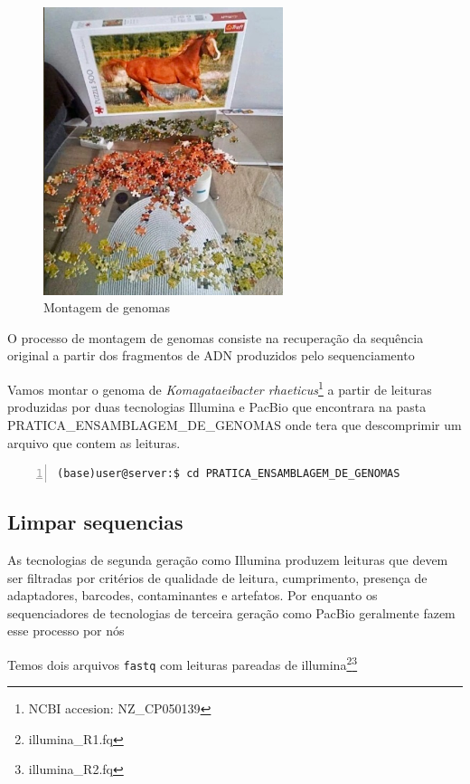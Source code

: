 \documentclass[letter,11pt]{book}
\begin{document}
\begin{figure}[h!]
\centering
 \includegraphics[width=7cm]{Figs/montagem_de_genoma.jpeg}
 \caption{\label{fig:fastqc}Montagem de genomas}
\end{figure}


O processo de montagem de genomas consiste na recuperação da sequência original a partir dos fragmentos de ADN produzidos pelo sequenciamento

Vamos montar o genoma de \emph{Komagataeibacter rhaeticus}\footnote{NCBI accesion: NZ\_CP050139} a partir de leituras produzidas por duas tecnologias Illumina e PacBio que encontrara na pasta PRATICA\_ENSAMBLAGEM\_DE\_GENOMAS onde tera que descomprimir um arquivo que contem as leituras.

\begin{Verbatim}[commandchars=!\{\}, numbers=left,label= indo na pasta de trabalho, frame=topline,fontsize=\scriptsize]
(base)user@server:$ cd PRATICA_ENSAMBLAGEM_DE_GENOMAS
\end{Verbatim}


\subsection{Limpar sequencias}
As tecnologias de segunda geração como Illumina produzem leituras que devem ser filtradas por critérios de qualidade de leitura, cumprimento, presença de adaptadores, barcodes, contaminantes e artefatos.
Por enquanto os sequenciadores de tecnologias de terceira geração como PacBio geralmente fazem esse processo por nós

Temos dois arquivos \Verb+fastq+ com leituras pareadas de illumina\footnote{illumina\_R1.fq}\footnote{illumina\_R2.fq}
\end{document}
